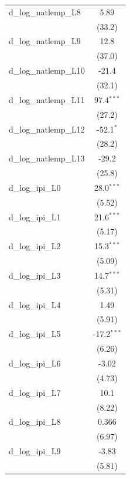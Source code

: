 \begin{tabular}{lc}
   d\_log\_natlemp\_L8     & 5.89\\   
                           & (33.2)\\   
   d\_log\_natlemp\_L9     & 12.8\\   
                           & (37.0)\\   
   d\_log\_natlemp\_L10    & -21.4\\   
                           & (32.1)\\   
   d\_log\_natlemp\_L11    & 97.4$^{***}$\\   
                           & (27.2)\\   
   d\_log\_natlemp\_L12    & -52.1$^{*}$\\   
                           & (28.2)\\   
   d\_log\_natlemp\_L13    & -29.2\\   
                           & (25.8)\\   
   d\_log\_ipi\_L0         & 28.0$^{***}$\\   
                           & (5.52)\\   
   d\_log\_ipi\_L1         & 21.6$^{***}$\\   
                           & (5.17)\\   
   d\_log\_ipi\_L2         & 15.3$^{***}$\\   
                           & (5.09)\\   
   d\_log\_ipi\_L3         & 14.7$^{***}$\\   
                           & (5.31)\\   
   d\_log\_ipi\_L4         & 1.49\\   
                           & (5.91)\\   
   d\_log\_ipi\_L5         & -17.2$^{***}$\\   
                           & (6.26)\\   
   d\_log\_ipi\_L6         & -3.02\\   
                           & (4.73)\\   
   d\_log\_ipi\_L7         & 10.1\\   
                           & (8.22)\\   
   d\_log\_ipi\_L8         & 0.366\\   
                           & (6.97)\\   
   d\_log\_ipi\_L9         & -3.83\\   
                           & (5.81)\\   

\end{tabular}

